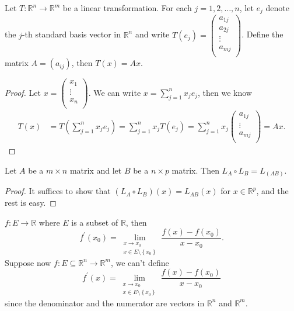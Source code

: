 \begin{proposition}
    Let \(T: \mathbb{R} ^n \to \mathbb{R} ^m\) be a linear transformation. For each \(j = 1, 2, \dots, n\), let \(e_j\) denote the \(j\)-th standard basis vector in \(\mathbb{R} ^n\) and write \(T(e_j) = \begin{pmatrix}
         a_{1j} \\
         a_{2j} \\
         \vdots \\
         a_{mj} \\
    \end{pmatrix}\). Define the matrix \(A = (a_{ij})\), then \(T(x) = Ax\).       
\end{proposition}
\begin{proof}
    Let \(x = \begin{pmatrix}
         x_1 \\
         \vdots \\
         x_n \\
    \end{pmatrix}\). We can write \(x = \sum_{j=1}^n x_j e_j \), then we know 
    \begin{align*}
        T(x) &= T \left( \sum_{j=1}^n x_j e_j  \right) = \sum_{j=1}^n x_j T(e_j) = \sum_{j=1}^n x_j \begin{pmatrix}
             a_{1j} \\
             \vdots \\
             a_{mj} \\
        \end{pmatrix} = Ax.  
    \end{align*}  
\end{proof}

\begin{lemma}
    Let \(A\) be a \(m \times n\) matrix and let \(B\) be a \(n \times p\) matrix. Then \(L_A \circ L_B = L_(AB)\).   
\end{lemma}
\begin{proof}
    It suffices to show that \((L_A \circ L_B)(x) = L_{AB}(x)\) for \(x \in \mathbb{R} ^p\), and the rest is easy.  
\end{proof}

\begin{prev}
    \(f : E \to \mathbb{R} \) where \(E\) is a subset of \(\mathbb{R}\), then 
    \[
        f^{\prime} (x_0) = \lim_{\substack{x \to x_0 \\ x \in E \setminus \left\{ x_0 \right\} }} \frac{f(x) - f(x_0)}{x - x_0}. 
    \]  
    Suppose now \(f: E \subseteq \mathbb{R} ^n \to \mathbb{R} ^m\), we can't define 
    \[
        f^{\prime} (x) = \lim_{\substack{x \to x_0 \\ x \in E \setminus \left\{ x_0 \right\} }} \frac{f(x) - f(x_0)}{x - x_0}
    \] 
    since the denominator and the numerator are vectors in \(\mathbb{R} ^n\) and \(\mathbb{R} ^m\).   
\end{prev}

